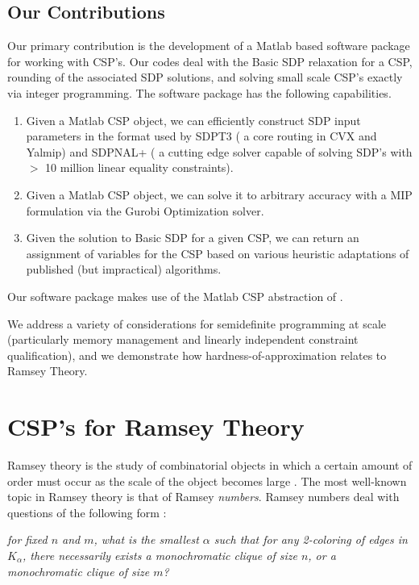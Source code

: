 \documentclass[12pt]{article} %
\begin{document}
\subsection{Our Contributions}
 
Our primary contribution is the development of a Matlab based software package for working with CSP's. Our codes deal with the Basic SDP relaxation for a CSP, rounding of the associated SDP solutions, and solving small scale CSP's exactly via integer programming. The software package has the following capabilities.

\begin{enumerate}
\item Given a Matlab CSP object, we can efficiently construct SDP input parameters in the format used by SDPT3 ( a core routing in CVX and Yalmip) and SDPNAL+ ( a cutting edge solver capable of solving SDP's with $>$ 10 million linear equality constraints).

\item Given a Matlab CSP object, we can solve it to arbitrary accuracy with a MIP formulation via the Gurobi Optimization solver.

\item Given the solution to Basic SDP for a given CSP, we can return an assignment of variables for the CSP based on various heuristic adaptations of published (but impractical) algorithms.
\end{enumerate}
Our software package makes use of the Matlab CSP abstraction of \cite{dwivedi2015introduction}.

We address a variety of considerations for semidefinite programming at scale (particularly memory management and linearly independent constraint qualification), and we demonstrate how hardness-of-approximation relates to Ramsey Theory.


\section{CSP's for Ramsey Theory}
Ramsey theory is the study of combinatorial objects in which a certain amount of order must occur as the scale of the object becomes large \cite{rt}. The most well-known topic in Ramsey theory is that of Ramsey \textit{numbers}. Ramsey numbers deal with questions of the following form : 

\vspace{1em}
\noindent \textit{for fixed $n$ and $m$, what is the smallest $\alpha$ such that for \textit{any} 2-coloring of edges in $K_\alpha$, there necessarily exists a monochromatic clique of size $n$, or a monochromatic clique of size $m$?}
\vspace{1em}
\end{document}
